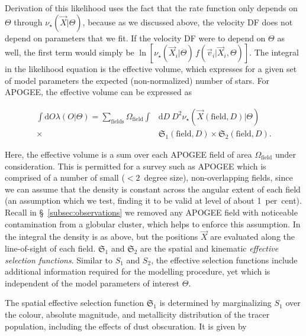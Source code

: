 \noindent Derivation of this likelihood uses the fact that the rate function only depends on $\Theta$ through $\nu_{\star}(\vec{X} \vert \Theta)$, because as we discussed above, the velocity DF does not depend on parameters that we fit. If the velocity DF were to depend on $\Theta$ as well, the first term would simply be $\ln [\nu_{\star}(\vec{X}_{i} \vert \Theta)\,f(\vec{v}_{i} \vert \vec{X}_i,\Theta)]$. The integral in the likelihood equation is the effective volume, which expresses for a given set of model parameters the expected (non-normalized) number of stars. For APOGEE, the effective volume can be expressed as 

\begin{equation}
\label{eq:effective-volume}
\begin{split}
	\int \mathrm{d}O \lambda(O \vert \Theta) = \sum_\mathrm{fields} \Omega_\mathrm{field} \int & \mathrm{d}D\ D^{2} \nu_{\star} (\vec{X}(\mathrm{field},D) \vert \Theta) \\
	\times & \mathfrak{S}_{1}(\mathrm{field},D) \times \mathfrak{S}_{2}(\mathrm{field},D).
\end{split}
\end{equation}

\noindent Here, the effective volume is a sum over each APOGEE field of area $\Omega_\mathrm{field}$ under consideration. This is permitted for a survey such as APOGEE which is comprised of a number of small ($< 2$~degree size), non-overlapping fields, since we can assume that the density is constant across the angular extent of each field (an assumption which we test, finding it to be valid at level of about 1~per~cent). Recall in \S~\ref{subsec:observations} we removed any APOGEE field with noticeable contamination from a globular cluster, which helps to enforce this assumption. In the integral the density is as above, but the positions $\vec{X}$ are evaluated along the line-of-sight of each field. $\mathfrak{S}_{1}$ and $\mathfrak{S}_{2}$ are the spatial and kinematic \textit{effective selection functions}. Similar to $S_{1}$ and $S_{2}$, the effective selection functions include additional information required for the modelling procedure, yet which is independent of the model parameters of interest $\Theta$. 

The spatial effective selection function $\mathfrak{S}_{1}$ is determined by marginalizing $S_{1}$ over the colour, absolute magnitude, and metallicity distribution of the tracer population, including the effects of dust obscuration. It is given by

